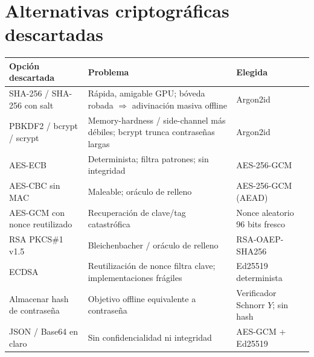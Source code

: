 \documentclass[11pt,a4paper]{article}
\begin{document}
\section{Alternativas criptográficas descartadas}
\begin{longtable}{@{}p{4.8cm}p{5.6cm}p{3.8cm}@{}}
\toprule
Opción descartada & Problema & Elegida \\
\midrule
SHA-256 / SHA-256 con salt & Rápida, amigable GPU; bóveda robada $\Rightarrow$ adivinación masiva offline & Argon2id \\
PBKDF2 / bcrypt / scrypt & Memory-hardness / side-channel más débiles; bcrypt trunca contraseñas largas & Argon2id \\
AES-ECB & Determinista; filtra patrones; sin integridad & AES-256-GCM \\
AES-CBC sin MAC & Maleable; oráculo de relleno & AES-256-GCM (AEAD) \\
AES-GCM con nonce reutilizado & Recuperación de clave/tag catastrófica & Nonce aleatorio 96 bits fresco \\
RSA PKCS\#1 v1.5 & Bleichenbacher / oráculo de relleno & RSA-OAEP-SHA256 \\
ECDSA & Reutilización de nonce filtra clave; implementaciones frágiles & Ed25519 determinista \\
Almacenar hash de contraseña & Objetivo offline equivalente a contraseña & Verificador Schnorr $Y$; sin hash \\
JSON / Base64 en claro & Sin confidencialidad ni integridad & AES-GCM + Ed25519 \\
\bottomrule
\end{longtable}
\end{document}
